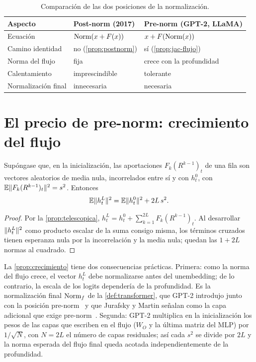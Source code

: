 \begin{table}[ht]
\centering\small
\caption{Comparación de las dos posiciones de la normalización.}\label{tab:prepost}
\begin{tabular}{@{}lll@{}}
\toprule
Aspecto & Post-norm (2017) & Pre-norm (GPT-2, LLaMA) \\
\midrule
Ecuación & $\operatorname{Norm}(x+F(x))$ & $x+F(\operatorname{Norm}(x))$ \\
Camino identidad & no (\cref{prop:postnorm}) & sí (\cref{prop:jac-flujo}) \\
Norma del flujo & fija & crece con la profundidad \\
Calentamiento & imprescindible & tolerante \\
Normalización final & innecesaria & necesaria \\
\bottomrule
\end{tabular}
\end{table}

\section{El precio de pre-norm: crecimiento del flujo}

\begin{proposicion}\label{prop:crecimiento}
Supóngase que, en la inicialización, las aportaciones $F_k(R^{k-1})_t$ de una fila son vectores aleatorios de media nula, incorrelados entre sí y con $h^{0}_t$, con $\mathbb{E}\lVert F_k(R^{k-1})_t\rVert^{2}=s^{2}$. Entonces
\[
\mathbb{E}\lVert h^{L}_t\rVert^{2}=\mathbb{E}\lVert h^{0}_t\rVert^{2}+2L\,s^{2}.
\]
\end{proposicion}

\begin{proof}
Por la \cref{prop:telescopica}, $h^{L}_t=h^{0}_t+\sum_{k=1}^{2L}F_k(R^{k-1})_t$. Al desarrollar $\lVert h^{L}_t\rVert^{2}$ como producto escalar de la suma consigo misma, los términos cruzados tienen esperanza nula por la incorrelación y la media nula; quedan las $1+2L$ normas al cuadrado.
\end{proof}

La \cref{prop:crecimiento} tiene dos consecuencias prácticas. Primera: como la norma del flujo crece, el vector $h^{L}_t$ debe normalizarse antes del unembedding; de lo contrario, la escala de los logits dependería de la profundidad. Es la normalización final $\operatorname{Norm}_f$ de la \cref{def:transformer}, que GPT-2 introdujo junto con la posición pre-norm~\cite[§2.3]{gpt2} y que Jurafsky y Martin señalan como la capa adicional que exige pre-norm~\cite[§7.2.3]{jm3}. Segunda: GPT-2 multiplica en la inicialización los pesos de las capas que escriben en el flujo ($W_O$ y la última matriz del MLP) por $1/\sqrt{N}$, con $N=2L$ el número de capas residuales; así cada $s^{2}$ se divide por $2L$ y la norma esperada del flujo final queda acotada independientemente de la profundidad.

